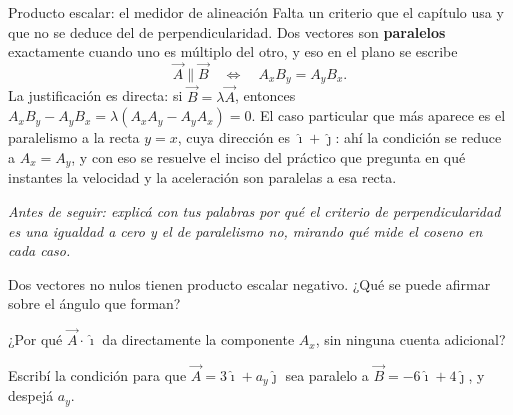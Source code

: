 \documentclass[11pt,openany]{book}
\begin{document}
\begin{bloque}{Producto escalar: el medidor de alineación}
Falta un criterio que el capítulo usa y que no se deduce del de perpendicularidad. Dos vectores son \textbf{paralelos} exactamente cuando uno es múltiplo del otro, y eso en el plano se escribe
\[
\vec A \parallel \vec B \quad\Longleftrightarrow\quad A_xB_y = A_yB_x.
\]
La justificación es directa: si $\vec B = \lambda\vec A$, entonces $A_xB_y - A_yB_x = \lambda(A_xA_y - A_yA_x) = 0$. El caso particular que más aparece es el paralelismo a la recta $y = x$, cuya dirección es $\hat\imath+\hat\jmath$: ahí la condición se reduce a $A_x = A_y$, y con eso se resuelve el inciso del práctico que pregunta en qué instantes la velocidad y la aceleración son paralelas a esa recta.

\textit{Antes de seguir: explicá con tus palabras por qué el criterio de perpendicularidad es una igualdad a cero y el de paralelismo no, mirando qué mide el coseno en cada caso.}
\end{bloque}

\begin{chequeo}
\item Dos vectores no nulos tienen producto escalar negativo. ¿Qué se puede afirmar sobre el ángulo que forman?
\item ¿Por qué $\vec A\cdot\hat\imath$ da directamente la componente $A_x$, sin ninguna cuenta adicional?
\item Escribí la condición para que $\vec A = 3\hat\imath + a_y\hat\jmath$ sea paralelo a $\vec B = -6\hat\imath + 4\hat\jmath$, y despejá $a_y$.
\end{chequeo}
\end{document}
